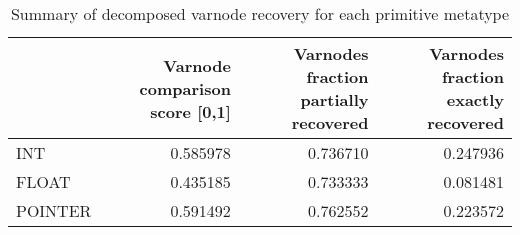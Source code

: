 \begin{table}
\centering
\caption{Summary of decomposed varnode recovery for each primitive metatype}
\label{table:metatype-recovery-summary-decomposed}
\begin{tabular}{lrrr}
\toprule
{} &  Varnode comparison score [0,1] &  Varnodes fraction partially recovered &  Varnodes fraction exactly recovered \\
\midrule
INT     &                        0.585978 &                               0.736710 &                             0.247936 \\
FLOAT   &                        0.435185 &                               0.733333 &                             0.081481 \\
POINTER &                        0.591492 &                               0.762552 &                             0.223572 \\
\bottomrule
\end{tabular}
\end{table}
